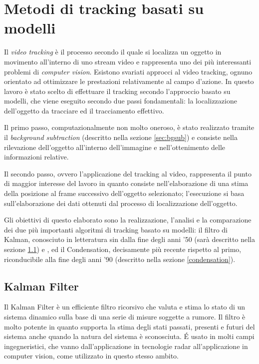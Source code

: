 \section{Metodi di tracking basati su modelli} \label{modelTracking}
Il \textit{video tracking} è il processo secondo il quale si localizza un oggetto in movimento all'interno di uno stream video e rappresenta uno dei più interessanti problemi di \textit{computer vision}. Esistono svariati approcci al video tracking, ognuno orientato ad ottimizzare le prestazioni relativamente al campo d'azione. In questo lavoro è stato scelto di effettuare il tracking secondo l'approccio basato su modelli, che viene eseguito secondo due passi fondamentali: la localizzazione dell'oggetto da tracciare ed il tracciamento effettivo.

Il primo passo, computazionalmente non molto oneroso, è stato realizzato tramite il \textit{background subtraction} (descritto nella sezione \ref{sec:bgsub}) e consiste nella rilevazione dell'oggetto all'interno dell'immagine e nell'ottenimento delle informazioni relative.

Il secondo passo, ovvero l'applicazione del tracking al video, rappresenta il punto di maggior interesse del lavoro in quanto consiste nell'elaborazione di una stima della posizione al frame successivo dell'oggetto selezionato; l'esecuzione si basa sull'elaborazione dei dati ottenuti dal processo di localizzazione dell'oggetto.

Gli obiettivi di questo elaborato sono la realizzazione, l'analisi e la comparazione dei due più importanti algoritmi di tracking basato su modelli: il filtro di Kalman, conosciuto in letteratura sin dalla fine degli anni '50 (sarà descritto nella sezione \ref{kalman}) e , ed il Condensation, decisamente più recente rispetto al primo, riconducibile alla fine degli anni '90 (descritto nella sezione \ref{condensation}).


\subsection{Kalman Filter}\label{kalman}
Il Kalman Filter\cite{kalman-intro} è un efficiente filtro ricorsivo che valuta e stima lo stato di un sistema dinamico sulla base di una serie di misure soggette a rumore. Il filtro è molto potente in quanto supporta la stima degli stati passati, presenti e futuri del sistema anche quando la natura del sistema è sconosciuta. \'E usato in molti campi ingegneristici, che vanno dall'applicazione in tecnologie radar all'applicazione in computer vision, come utilizzato in questo stesso ambito.

